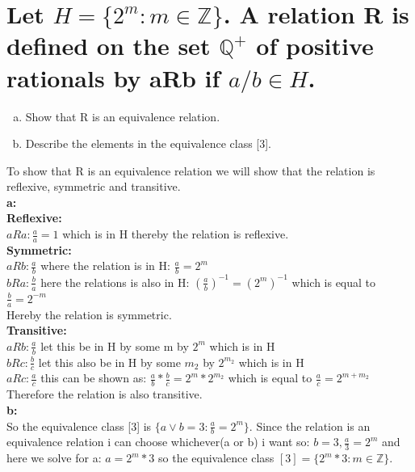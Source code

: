 \section{Let $H = \{2^m : m\in \mathbb{Z}\}$. A relation R is defined on the set $\mathbb{Q}^{+}$ of positive rationals by aRb if $a/b\in H$.}
\begin{enumerate}[a.]
\item Show that R is an equivalence relation.
\item Describe the elements in the equivalence class [3].
\end{enumerate}
To show that R is an equivalence relation we will show that the relation is reflexive, symmetric and transitive.\\
\textbf{a:}\\
\textbf{Reflexive:}\\
$aRa: \frac{a}{a}=1$ which is in H thereby the relation is reflexive.\\
\textbf{Symmetric:}\\
$aRb: \frac{a}{b}$ where the relation is in H: $\frac{a}{b}=2^m$\\
$bRa: \frac{b}{a}$ here the relations is also in H: $\left(\frac{a}{b}\right)^{-1}=\left(2^m\right)^{-1}$ which is equal to $\frac{b}{a}=2^{-m}$\\
Hereby the relation is symmetric.\\
\textbf{Transitive:}\\
$aRb:\frac{a}{b}$ let this be in H by some m by $2^m$ which is in H\\
$bRc:\frac{b}{c}$ let this also be in H by some $m_2$ by $2^{m_2}$ which is in H\\
$aRc:\frac{a}{c}$ this can be shown as: $\frac{a}{b}*\frac{b}{c}=2^m*2^{m_2}$ which is equal to $\frac{a}{c}=2^{m+m_2}$\\
Therefore the relation is also transitive.\\
\textbf{b:}\\
So the equivalence class [3] is $\{a\vee b=3:\frac{a}{b}=2^m\}$. Since the relation is an equivalence relation i can choose whichever(a or b) i want so: $b=3,\frac{a}{3}=2^m$ and here we solve for a: $a=2^m*3$ so the equivalence class $[3]=\{2^m*3:m\in\mathbb{Z}\}$.
\newpage
